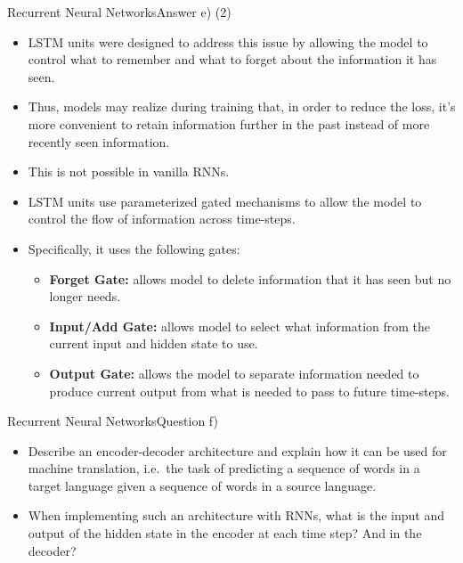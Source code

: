 \documentclass[t]{beamer}
\begin{document}
\begin{frame}{Recurrent Neural Networks}{Answer e) (2)}
    \begin{itemize}
        \item LSTM units were designed to address this issue by allowing the
              model to control what to remember and what to forget about the
              information it has seen.
        \item Thus, models may realize during training that, in order to
              reduce the loss, it's more convenient to retain information
              further in the past instead of more recently seen information.
        \item This is not possible in vanilla RNNs.
        \item LSTM units use parameterized gated mechanisms to allow the model
              to control the flow of information across time-steps.
        \item Specifically, it uses the following gates:
              \begin{itemize}
                  \item \textbf{Forget Gate:} allows model to delete information
                        that it has seen but no longer needs.
                  \item \textbf{Input/Add Gate:} allows model to select what
                        information from the current input and hidden state to
                        use.
                  \item \textbf{Output Gate:} allows the model to separate
                        information needed to produce current output from what
                        is needed to pass to future time-steps.
              \end{itemize}
    \end{itemize}
\end{frame}

\begin{frame}{Recurrent Neural Networks}{Question f)}
    \begin{itemize}
        \item Describe an encoder-decoder architecture and explain how it can be
              used for machine translation, i.e.\ the task of predicting a
              sequence of words in a target language given a sequence of words
              in a source language.
        \item When implementing such an architecture with RNNs, what is the
              input and output of the hidden state in the encoder at each time
              step? And in the decoder?
    \end{itemize}
\end{frame}
\end{document}

